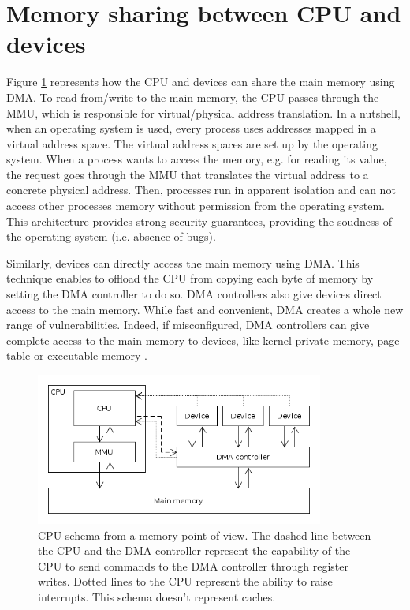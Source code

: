 \documentclass{kththesis}
\begin{document}
\section{Memory sharing between CPU and devices} \label{dma-mem-sharing}

Figure \ref{cpu-memory-schema} represents how the \gls{CPU} and devices can share the main memory using \acrfull{DMA}. To read from/write to the main memory, the CPU passes through the \gls{MMU}, which is responsible for virtual/physical address translation. In a nutshell, when an operating system is used, every process uses addresses mapped in a virtual address space. The virtual address spaces are set up by the operating system. When a process wants to access the memory, e.g. for reading its value, the request goes through the MMU that translates the virtual address to a concrete physical address. Then, processes run in apparent isolation and can not access other processes memory without permission from the operating system. This architecture provides strong security guarantees, providing the soudness of the operating system (i.e. absence of bugs).

Similarly, devices can directly access the main memory using DMA. This technique enables to offload the CPU from copying each byte of memory by setting the DMA controller to do so. DMA controllers also give devices direct access to the main memory. While fast and convenient, DMA creates a whole new range of vulnerabilities. Indeed, if misconfigured, DMA controllers can give complete access to the main memory to devices, like kernel private memory, page table or executable memory \cite{schwarz_formal_2014}.

\begin{figure}[!t]
	\includegraphics[height=5cm]{figures/cpu-memory-schema.png}
	\centering
	\caption{CPU schema from a memory point of view. The dashed line between the CPU and the DMA controller represent the capability of the CPU to send commands to the DMA controller through register writes. Dotted lines to the CPU represent the ability to raise interrupts. This schema doesn't represent caches.}
	\label{cpu-memory-schema}
\end{figure}
\end{document}

